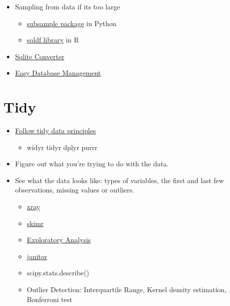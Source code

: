 \documentclass[]{book}
\providecommand{\tightlist}{%
  \setlength{\itemsep}{0pt}\setlength{\parskip}{0pt}}
\theoremstyle{definition}
\theoremstyle{definition}
\theoremstyle{definition}
\theoremstyle{remark}
\begin{document}
\begin{itemize}
\item
  Sampling from data if its too large

  \begin{itemize}
  \tightlist
  \item
    \href{https://pypi.python.org/pypi/subsample}{subsample package} in
    Python
  \item
    \href{https://stackoverflow.com/a/22262726/6627726}{sqldf library}
    in R
  \end{itemize}
\item
  \href{https://github.com/thombashi/sqlitebiter}{Sqlite Converter}
\item
  \href{https://dataset.readthedocs.io/en/latest/}{Easy Database
  Management}
\end{itemize}

\section{Tidy}\label{tidy}

\begin{itemize}
\item
  \href{http://vita.had.co.nz/papers/tidy-data.pdf}{Follow tidy data
  principles}

  \begin{itemize}
  \tightlist
  \item
    widyr \textbar{} tidyr \textbar{} dplyr \textbar{} purrr
  \end{itemize}
\item
  Figure out what you're trying to do with the data.
\item
  See what the data looks like: types of variables, the first and last
  few observations, missing values or outliers.

  \begin{itemize}
  \tightlist
  \item
    \href{https://blog.datascienceheroes.com/x-ray-vision-on-your-datasets/}{xray}
  \item
    \href{https://github.com/ropenscilabs/skimr}{skimr}
  \item
    \href{https://github.com/ujjwalkarn/xda}{Exploratory Analysis}
  \item
    \href{https://cran.r-project.org/web/packages/janitor/vignettes/introduction.html}{janitor}
  \item
    scipy.stats.describe()
  \item
    Outlier Detection: Interquartile Range, Kernel density estimation,
    Bonferroni test
  \end{itemize}
\end{itemize}
\end{document}
